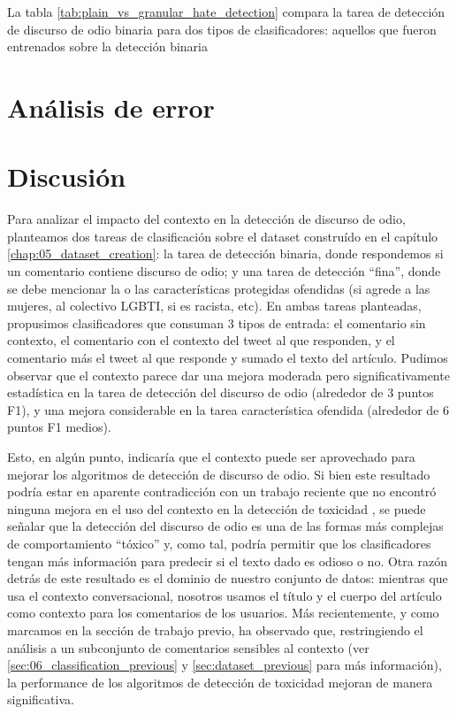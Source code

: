 La tabla \ref{tab:plain_vs_granular_hate_detection} compara la tarea de detección de discurso de odio binaria para dos tipos de clasificadores: aquellos que fueron entrenados sobre la detección binaria




\section{Análisis de error}





\section{Discusión}

Para analizar el impacto del contexto en la detección de discurso de odio, planteamos dos tareas de clasificación sobre el dataset construído en el capítulo \ref{chap:05_dataset_creation}: la tarea de detección binaria, donde respondemos si un comentario contiene discurso de odio; y una tarea de detección ``fina'', donde se debe mencionar la o las características protegidas ofendidas (si agrede a las mujeres, al colectivo LGBTI, si es racista, etc). En ambas tareas planteadas, propusimos clasificadores que consuman 3 tipos de entrada: el comentario sin contexto, el comentario con el contexto del tweet al que responden, y el comentario más el tweet al que responde y sumado el texto del artículo. Pudimos observar que el contexto parece dar una mejora moderada pero significativamente estadística en la tarea de detección del discurso de odio (alrededor de 3 puntos F1), y una mejora considerable en la tarea característica ofendida (alrededor de 6 puntos F1 medios).

Esto, en algún punto, indicaría que el contexto puede ser aprovechado para mejorar los algoritmos de detección de discurso de odio. Si bien este resultado podría estar en aparente contradicción con un trabajo reciente que no encontró ninguna mejora en el uso del contexto en la detección de toxicidad \cite{pavlopoulos2020toxicity}, se puede señalar que la detección del discurso de odio es una de las formas más complejas de comportamiento ``tóxico'' y, como tal, podría permitir que los clasificadores tengan más información para predecir si el texto dado es odioso o no. Otra razón detrás de este resultado es el dominio de nuestro conjunto de datos: mientras que \citet{pavlopoulos2020toxicity} usa el contexto conversacional, nosotros usamos el título y el cuerpo del artículo como contexto para los comentarios de los usuarios. Más recientemente, y como marcamos en la sección de trabajo previo, \citet{xenos-2021-context} ha observado que, restringiendo el análisis a un subconjunto de comentarios sensibles al contexto (ver \ref{sec:06_classification_previous} y \ref{sec:dataset_previous} para más información), la performance de los algoritmos de detección de toxicidad mejoran de manera significativa.

